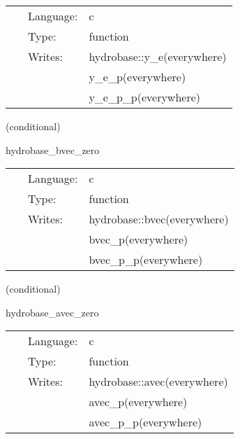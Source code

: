 \hspace{5mm}{\it set electron fraction to 1 } 


\hspace{5mm}

 \begin{tabular*}{160mm}{cll} 
~ & Language:  & c \\ 
~ & Type:  & function \\ 
~ & Writes:  & hydrobase::y\_e(everywhere) \\ 
~& ~ &y\_e\_p(everywhere)\\ 
~& ~ &y\_e\_p\_p(everywhere)\\ 
\end{tabular*} 


\vspace{5mm}

   (conditional) 

\hspace{5mm} hydrobase\_bvec\_zero 

\hspace{5mm}{\it set magnetic field to 0 } 


\hspace{5mm}

 \begin{tabular*}{160mm}{cll} 
~ & Language:  & c \\ 
~ & Type:  & function \\ 
~ & Writes:  & hydrobase::bvec(everywhere) \\ 
~& ~ &bvec\_p(everywhere)\\ 
~& ~ &bvec\_p\_p(everywhere)\\ 
\end{tabular*} 


\vspace{5mm}

   (conditional) 

\hspace{5mm} hydrobase\_avec\_zero 

\hspace{5mm}{\it set vector potential to 0 } 


\hspace{5mm}

 \begin{tabular*}{160mm}{cll} 
~ & Language:  & c \\ 
~ & Type:  & function \\ 
~ & Writes:  & hydrobase::avec(everywhere) \\ 
~& ~ &avec\_p(everywhere)\\ 
~& ~ &avec\_p\_p(everywhere)\\ 
\end{tabular*} 


